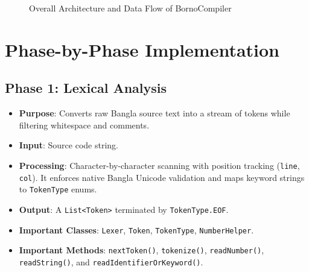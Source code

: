 \documentclass[12pt, a4paper]{report}
\begin{document}
\begin{figure}[H]
\caption{Overall Architecture and Data Flow of BornoCompiler}
\label{fig:compiler_arch}
\end{figure}

\chapter{Phase-by-Phase Implementation}

\section{Phase 1: Lexical Analysis}
\begin{itemize}
    \item \textbf{Purpose}: Converts raw Bangla source text into a stream of tokens while filtering whitespace and comments.
    \item \textbf{Input}: Source code string.
    \item \textbf{Processing}: Character-by-character scanning with position tracking (\texttt{line}, \texttt{col}). It enforces native Bangla Unicode validation and maps keyword strings to \texttt{TokenType} enums.
    \item \textbf{Output}: A \texttt{List<Token>} terminated by \texttt{TokenType.EOF}.
    \item \textbf{Important Classes}: \texttt{Lexer}, \texttt{Token}, \texttt{TokenType}, \texttt{NumberHelper}.
    \item \textbf{Important Methods}: \texttt{nextToken()}, \texttt{tokenize()}, \texttt{readNumber()}, \texttt{readString()}, and \texttt{readIdentifierOrKeyword()}.
\end{itemize}
\end{document}
